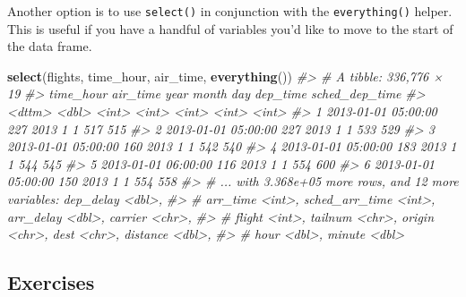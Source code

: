 \documentclass[]{book}
\newenvironment{Shaded}{\begin{snugshade}}{\end{snugshade}}
\newcommand{\KeywordTok}[1]{\textcolor[rgb]{0.13,0.29,0.53}{\textbf{{#1}}}}
\newcommand{\CommentTok}[1]{\textcolor[rgb]{0.56,0.35,0.01}{\textit{{#1}}}}
\newcommand{\NormalTok}[1]{{#1}}
\begin{document}
Another option is to use \texttt{select()} in conjunction with the
\texttt{everything()} helper. This is useful if you have a handful of
variables you'd like to move to the start of the data frame.

\begin{Shaded}
\begin{Highlighting}[]
\KeywordTok{select}\NormalTok{(flights, time_hour, air_time, }\KeywordTok{everything}\NormalTok{())}
\CommentTok{#> # A tibble: 336,776 × 19}
\CommentTok{#>             time_hour air_time  year month   day dep_time sched_dep_time}
\CommentTok{#>                <dttm>    <dbl> <int> <int> <int>    <int>          <int>}
\CommentTok{#> 1 2013-01-01 05:00:00      227  2013     1     1      517            515}
\CommentTok{#> 2 2013-01-01 05:00:00      227  2013     1     1      533            529}
\CommentTok{#> 3 2013-01-01 05:00:00      160  2013     1     1      542            540}
\CommentTok{#> 4 2013-01-01 05:00:00      183  2013     1     1      544            545}
\CommentTok{#> 5 2013-01-01 06:00:00      116  2013     1     1      554            600}
\CommentTok{#> 6 2013-01-01 05:00:00      150  2013     1     1      554            558}
\CommentTok{#> # ... with 3.368e+05 more rows, and 12 more variables: dep_delay <dbl>,}
\CommentTok{#> #   arr_time <int>, sched_arr_time <int>, arr_delay <dbl>, carrier <chr>,}
\CommentTok{#> #   flight <int>, tailnum <chr>, origin <chr>, dest <chr>, distance <dbl>,}
\CommentTok{#> #   hour <dbl>, minute <dbl>}
\end{Highlighting}
\end{Shaded}

\subsection{Exercises}\label{exercises-9}
\end{document}
